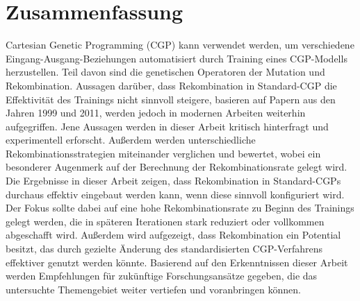 \section*{Zusammenfassung}

Cartesian Genetic Programming (CGP) kann verwendet werden, um verschiedene Eingang-Ausgang-Beziehungen automatisiert durch Training eines CGP-Modells herzustellen.
Teil davon sind die genetischen Operatoren der Mutation und Rekombination.
Aussagen darüber, dass Rekombination in Standard-CGP die Effektivität des Trainings nicht sinnvoll steigere, basieren auf Papern aus den Jahren 1999 und 2011, werden jedoch in modernen Arbeiten weiterhin aufgegriffen.
Jene Aussagen werden in dieser Arbeit kritisch hinterfragt und experimentell erforscht.
Außerdem werden unterschiedliche Rekombinationsstrategien miteinander verglichen und bewertet, wobei ein besonderer Augenmerk auf der Berechnung der Rekombinationsrate gelegt wird.
Die Ergebnisse in dieser Arbeit zeigen, dass Rekombination in Standard-CGPs durchaus effektiv eingebaut werden kann, wenn diese sinnvoll konfiguriert wird.
Der Fokus sollte dabei auf eine hohe Rekombinationsrate zu Beginn des Trainings gelegt werden, die in späteren Iterationen stark reduziert oder vollkommen abgeschafft wird.
Außerdem wird aufgezeigt, dass Rekombination ein Potential besitzt, das durch gezielte Änderung des standardisierten CGP-Verfahrens effektiver genutzt werden könnte.
Basierend auf den Erkenntnissen dieser Arbeit werden Empfehlungen für zukünftige Forschungsansätze gegeben, die das untersuchte Themengebiet weiter vertiefen und voranbringen können.
